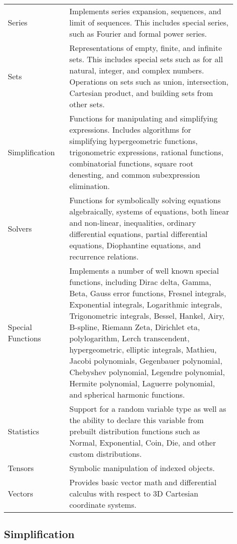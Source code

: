 \begin{longtable}[htbc]{p{0.25\linewidth}p{0.68\linewidth}}
Series & Implements series expansion, sequences, and limit of sequences.
This includes special series, such as Fourier and formal power series.\\

Sets & Representations of empty, finite, and infinite sets. This includes
special sets such as for all natural, integer, and complex numbers. Operations
on sets such as union, intersection, Cartesian product, and building sets from
other sets.\\

Simplification & Functions for manipulating and simplifying expressions.
Includes algorithms for simplifying hypergeometric functions, trigonometric
expressions, rational functions, combinatorial functions, square root
denesting, and common subexpression elimination.\\

Solvers & Functions for symbolically solving equations algebraically, systems
of equations, both linear and non-linear, inequalities, ordinary differential
equations, partial differential equations, Diophantine equations, and
recurrence relations.\\

Special Functions & Implements a number of well known special functions,
including Dirac delta, Gamma, Beta, Gauss error functions, Fresnel integrals,
Exponential integrals, Logarithmic integrals, Trigonometric integrals, Bessel,
Hankel, Airy, B-spline, Riemann Zeta, Dirichlet eta, polylogarithm, Lerch
transcendent, hypergeometric, elliptic integrals, Mathieu, Jacobi polynomials,
Gegenbauer polynomial, Chebyshev polynomial, Legendre polynomial, Hermite
polynomial, Laguerre polynomial, and
spherical harmonic functions.\\

Statistics & Support for a random variable type as well as the ability to
declare this variable from prebuilt distribution functions such as
Normal, Exponential, Coin, Die, and other custom distributions.\\

Tensors & Symbolic manipulation of indexed objects.\\

Vectors & Provides basic vector math and differential calculus with respect
to 3D Cartesian coordinate systems.\\
\bottomrule

\end{longtable}

\subsection{Simplification}

